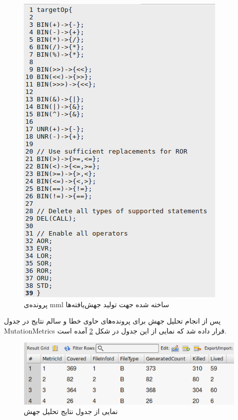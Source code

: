 \begin{itemize}
\begin{figure}[H]
	\centering
	\includegraphics[width=.7\textwidth]{img/case_study/mml-used.png}
	\caption{پرونده‌ی mml ساخته شده جهت تولید جهش‌یافته‌ها}
	\label{fig:mml-used}
\end{figure}
\end{itemize}
 پس از انجام تحلیل جهش برای پرونده‌های حاوی خطا و سالم نتایج در جدول MutationMetrics قرار داده شد که نمایی از این جدول در شکل \ref{fig:mutation-metrics}  آمده است. 
 
 
 \begin{figure}[H]
 	\centering
 	\includegraphics[width=.7\textwidth]{img/case_study/mutation-metrics.png}
 	\caption{نمایی از جدول نتایج تحلیل جهش}
 	\label{fig:mutation-metrics}
 \end{figure}
 